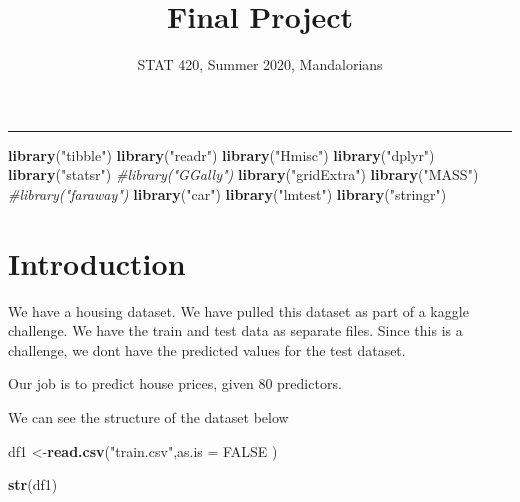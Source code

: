 \documentclass[
]{article}
\title{Final Project}
\author{STAT 420, Summer 2020, Mandalorians}
\date{}
\newenvironment{Shaded}{\begin{snugshade}}{\end{snugshade}}
\newcommand{\CommentTok}[1]{\textcolor[rgb]{0.56,0.35,0.01}{\textit{#1}}}
\newcommand{\DataTypeTok}[1]{\textcolor[rgb]{0.13,0.29,0.53}{#1}}
\newcommand{\KeywordTok}[1]{\textcolor[rgb]{0.13,0.29,0.53}{\textbf{#1}}}
\newcommand{\NormalTok}[1]{#1}
\newcommand{\OtherTok}[1]{\textcolor[rgb]{0.56,0.35,0.01}{#1}}
\newcommand{\StringTok}[1]{\textcolor[rgb]{0.31,0.60,0.02}{#1}}
\begin{document}
\maketitle

{
\hypersetup{linkcolor=}
\setcounter{tocdepth}{2}
\tableofcontents
}

\begin{center}\rule{0.5\linewidth}{0.5pt}\end{center}

\begin{Shaded}
\begin{Highlighting}[]
\KeywordTok{library}\NormalTok{(}\StringTok{"tibble"}\NormalTok{)}
\KeywordTok{library}\NormalTok{(}\StringTok{"readr"}\NormalTok{)}
\KeywordTok{library}\NormalTok{(}\StringTok{"Hmisc"}\NormalTok{)}
\KeywordTok{library}\NormalTok{(}\StringTok{"dplyr"}\NormalTok{)}
\KeywordTok{library}\NormalTok{(}\StringTok{"statsr"}\NormalTok{)}
\CommentTok{#library("GGally")}
\KeywordTok{library}\NormalTok{(}\StringTok{"gridExtra"}\NormalTok{)}
\KeywordTok{library}\NormalTok{(}\StringTok{"MASS"}\NormalTok{)}
\CommentTok{#library("faraway")}
\KeywordTok{library}\NormalTok{(}\StringTok{"car"}\NormalTok{)}
\KeywordTok{library}\NormalTok{(}\StringTok{"lmtest"}\NormalTok{)}
\KeywordTok{library}\NormalTok{(}\StringTok{"stringr"}\NormalTok{)}
\end{Highlighting}
\end{Shaded}

\hypertarget{introduction}{%
\section{Introduction}\label{introduction}}

We have a housing dataset. We have pulled this dataset as part of a kaggle challenge. We have the train and test data as separate files. Since this is a challenge, we dont have the predicted values for the test dataset.

Our job is to predict house prices, given 80 predictors.

We can see the structure of the dataset below

\begin{Shaded}
\begin{Highlighting}[]
\NormalTok{df1 <-}\KeywordTok{read.csv}\NormalTok{(}\StringTok{"train.csv"}\NormalTok{,}\DataTypeTok{as.is =} \OtherTok{FALSE}\NormalTok{ )}

\KeywordTok{str}\NormalTok{(df1)}
\end{Highlighting}
\end{Shaded}
\end{document}
